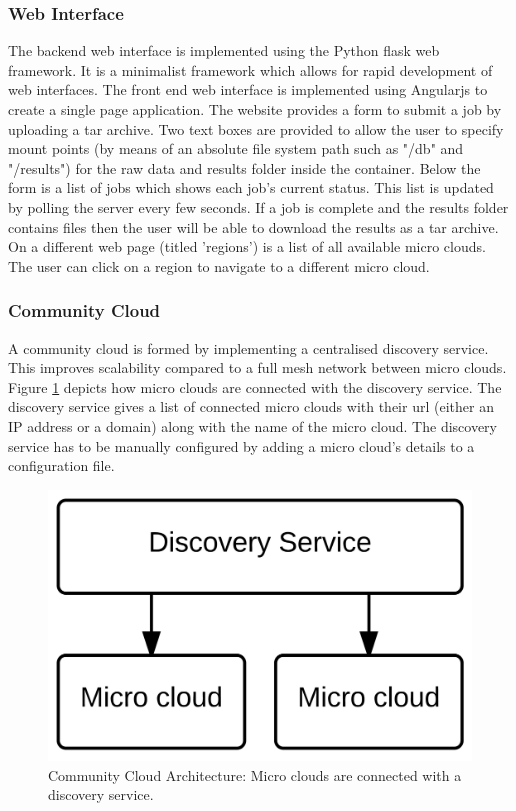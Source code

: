 \documentclass{sig-alternate-05-2015}
\begin{document}
\subsubsection{Web Interface}
The backend web interface is implemented using the Python flask web framework. It is a minimalist framework which allows for rapid development of web interfaces. 
The front end web interface is implemented using Angularjs to create a single page application. The website provides a form to submit a job by uploading a tar archive. Two text boxes are provided to allow the user to specify mount points (by means of an absolute file system path such as "/db" and "/results") for the raw data and results folder inside the container. Below the form is a list of jobs which shows each job's current status. This list is updated by polling the server every few seconds. If a job is complete and the results folder contains files then the user will be able to download the results as a tar archive. On a different web page (titled 'regions') is a list of all available micro clouds. The user can click on a region to navigate to a different micro cloud.

\subsubsection{Community Cloud}
A community cloud is formed by implementing a centralised discovery service. This improves scalability compared to a full mesh network between micro clouds. Figure \ref{fig:discovery} depicts how micro clouds are connected with the discovery service. The discovery service gives a list of connected micro clouds with their url (either an IP address or a domain) along with the name of the micro cloud. The discovery service has to be manually configured by adding a micro cloud's details to a configuration file.

\begin{figure}
\centering
\includegraphics[scale=0.3]{img/communitycloud}
\caption{Community Cloud Architecture: Micro clouds are connected with a discovery service.}
\label{fig:discovery}
\end{figure}
\end{document}
